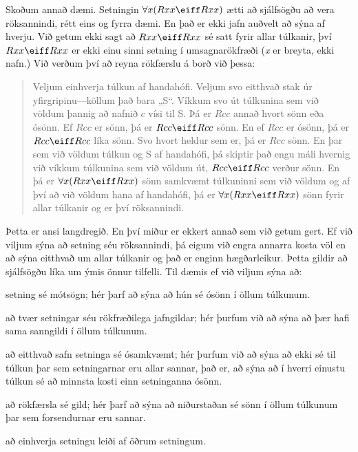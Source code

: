 Skoðum annað dæmi. Setningin $\forall x(Rxx\eiff Rxx)$ ætti að sjálfsögðu að vera röksannindi, rétt eins og fyrra dæmi. En það er ekki jafn auðvelt að sýna af hverju. Við getum ekki sagt að $Rxx \eiff Rxx$ sé satt fyrir allar túlkanir, því $Rxx \eiff Rxx$ er ekki einu sinni setning í umsagnarökfræði (\emph{x} er breyta, ekki nafn.) Við verðum því að reyna rökfærslu á borð við þessa:
	\begin{quote}
		Veljum einhverja túlkun af handahófi. Veljum svo eitthvað stak úr yfirgripinu---köllum það bara „S“. Víkkum svo út túlkunina sem við völdum þannig að nafnið $c$ vísi til S. Þá er $Rcc$ annað hvort sönn eða ósönn. Ef $Rcc$ er sönn, þá er $Rcc \eiff Rcc$ sönn. En ef $Rcc$ er ósönn, þá er $Rcc \eiff Rcc$ líka sönn. Svo hvort heldur sem er, þá er $Rcc$ sönn. En þar sem við völdum túlkun og S af handahófi, þá skiptir það engu máli hvernig við víkkum túlkunina sem við völdum út, $Rcc \eiff Rcc$ verður sönn. En þá er $\forall x (Rxx \eiff Rxx)$ sönn samkvæmt túlkuninni sem við völdum og af því að við völdum hana af handahófi, þá er $\forall x (Rxx \eiff Rxx)$ sönn fyrir allar túlkanir og er því röksannindi.
	\end{quote}
Þetta er ansi langdregið. En því miður er ekkert annað sem við getum gert. Ef við viljum sýna að setning séu röksannindi, þá eigum við engra annarra kosta völ en að sýna eitthvað um allar túlkanir og það er enginn hægðarleikur. Þetta gildir að sjálfsögðu líka um ýmis önnur tilfelli. Til dæmis ef við viljum sýna að:
	\begin{ebullet}
		\item setning sé mótsögn; hér þarf að sýna að hún sé ósönn í öllum túlkunum. 
		\item að tvær setningar séu rökfræðilega jafngildar; hér þurfum við að sýna að þær hafi sama sanngildi í öllum túlkunum.
		\item að eitthvað safn setninga sé ósamkvæmt; hér þurfum við að sýna að ekki sé til túlkun þar sem setningarnar eru allar sannar, það er, að sýna að í hverri einustu túlkun sé að minnsta kosti einn setninganna ósönn.
		\item að rökfærsla sé gild; hér þarf að sýna að niðurstaðan sé sönn í öllum túlkunum þar sem forsendurnar eru sannar.
		\item að einhverja setningu leiði af öðrum setningum.
	\end{ebullet}
